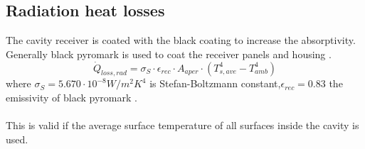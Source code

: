 \subsection{Radiation heat losses}
The cavity receiver is coated with the black coating to increase the absorptivity. Generally black pyromark is used to coat the receiver panels and housing \cite{Zavoico.2001}.
\begin{equation}
\dot Q_{loss,rad}=\sigma_S\cdot \epsilon_{rec}\cdot A_{aper}\cdot (T_{s,ave}^4-T_{amb}^4)
\end{equation}
where $\sigma_S = 5.670 \cdot 10^{-8} W / m^2 K^4$ is  Stefan-Boltzmann constant,$\epsilon_{rec} = 0.83$ the emissivity of black pyromark \cite{Zavoico.2001}. \\\\
This is valid if the average surface temperature of all surfaces inside the cavity is used.
